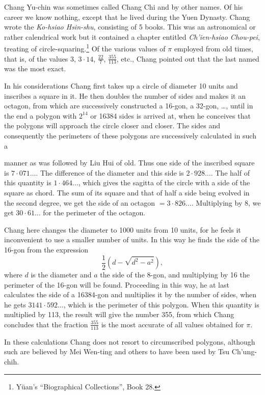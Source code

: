 \documentclass[11pt]{article}
\newcommand{\scanpage}[2]{\clearpage\setcounter{footnote}{0}\noindent{\footnotesize\color{gray}PDF page #1 · #2}\par\medskip}
\newcommand{\scanfooter}{}
\begin{document}
Chang Yu-chin was sometimes called Chang Chi and by other names. Of his career we know nothing, except that he lived during the Yuen Dynasty. Chang wrote the \emph{Ko-hsiao Hsin-shu}, consisting of 5 books. This was an astronomical or rather calendrical work but it contained a chapter entitled \emph{Ch'ien-hsiao Chou-pei}, treating of circle-squaring.\footnote{Yüan's ``Biographical Collections'', Book 28.} Of the various values of $\pi$ employed from old times, that is, of the values $3$, $3\cdot14$, $\frac{22}{7}$, $\frac{355}{113}$, etc., Chang pointed out that the last named was the most exact.

In his considerations Chang first takes up a circle of diameter 10 units and inscribes a square in it. He then doubles the number of sides and makes it an octagon, from which are successively constructed a 16-gon, a 32-gon, \ldots, until in the end a polygon with $2^{14}$ or 16384 sides is arrived at, when he conceives that the polygons will approach the circle closer and closer. The sides and consequently the perimeters of these polygons are successively calculated in such a
\scanfooter

\scanpage{0150}{Chapter 20, printed page 136}
manner as was followed by Liu Hui of old. Thus one side of the inscribed square is $7\cdot071\ldots$. The difference of the diameter and this side is $2\cdot928\ldots$. The half of this quantity is $1\cdot464\ldots$, which gives the sagitta of the circle with a side of the square as chord. The sum of its square and that of half a side being evolved in the second degree, we get the side of an octagon $=3\cdot826\ldots$. Multiplying by 8, we get $30\cdot61\ldots$ for the perimeter of the octagon.

Chang here changes the diameter to 1000 units from 10 units, for he feels it inconvenient to use a smaller number of units. In this way he finds the side of the 16-gon from the expression
\[
\frac{1}{2}\left(d-\sqrt{d^2-a^2}\right),
\]
where $d$ is the diameter and $a$ the side of the 8-gon, and multiplying by 16 the perimeter of the 16-gon will be found. Proceeding in this way, he at last calculates the side of a 16384-gon and multiplies it by the number of sides, when he gets $3141\cdot592\ldots$, which is the perimeter of this polygon. When this quantity is multiplied by 113, the result will give the number 355, from which Chang concludes that the fraction $\frac{355}{113}$ is the most accurate of all values obtained for $\pi$.

In these calculations Chang does not resort to circumscribed polygons, although such are believed by Mei Wen-ting and others to have been used by Tsu Ch'ung-chih.
\end{document}
